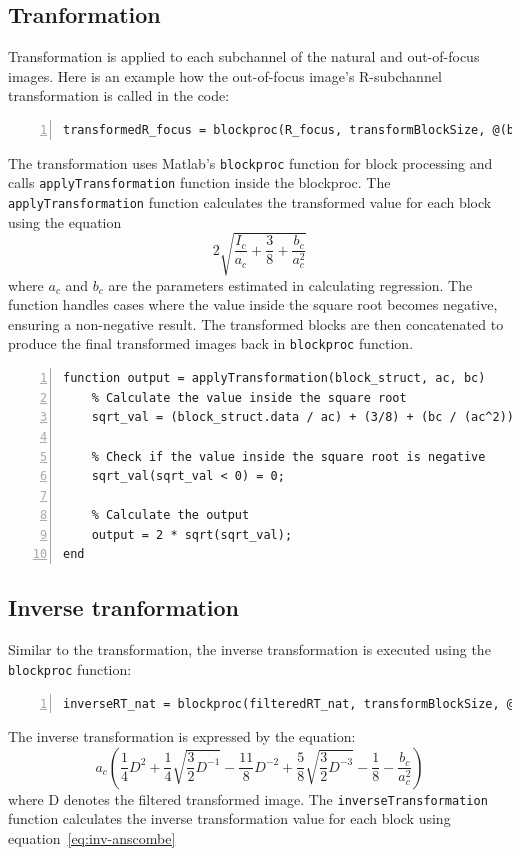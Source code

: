 \documentclass[12pt,a4paper,english
]{tunithesis}
\begin{document}
\subsection{Tranformation}
Transformation is applied to each subchannel of the natural and out-of-focus images. 
 Here is an example how the out-of-focus image's R-subchannel transformation is called in the code:
 \begin{lstlisting}[style=Matlab-editor, numbers=left, basicstyle=\small]
 transformedR_focus = blockproc(R_focus, transformBlockSize, @(block_struct) applyTransformation(block_struct, pR_focus(1), pR_focus(2)));
\end{lstlisting}
The transformation uses Matlab's \texttt{blockproc} function for block processing and calls \texttt{applyTransformation} function inside the blockproc. The \texttt{applyTransformation} function calculates the transformed value for each block using the equation
\begin{equation}
\label{eq:anscombe}
  2 \sqrt{\frac{I_{c}}{a_{c}} + \frac{3}{8} + \frac{b_{c}}{a_{c}^2}}
\end{equation}
 where $a_c$ and $b_c$ are the parameters estimated in calculating regression. The function handles cases where the value inside the square root becomes negative, ensuring a non-negative result. The transformed blocks are then concatenated to produce the final transformed images back in \texttt{blockproc} function.

\begin{lstlisting}[style=Matlab-editor, numbers=left, basicstyle=\small]
% 6. Transformation
function output = applyTransformation(block_struct, ac, bc)
    % Calculate the value inside the square root
    sqrt_val = (block_struct.data / ac) + (3/8) + (bc / (ac^2));

    % Check if the value inside the square root is negative
    sqrt_val(sqrt_val < 0) = 0;

    % Calculate the output
    output = 2 * sqrt(sqrt_val);
end
\end{lstlisting}
\subsection{Inverse tranformation}
Similar to the transformation, the inverse transformation is executed using the \texttt{blockproc} function:
\begin{lstlisting}[style=Matlab-editor, numbers=left, basicstyle=\small]
inverseRT_nat = blockproc(filteredRT_nat, transformBlockSize, @(block_struct) inverseTransformation(block_struct, pR_nat(1), pR_nat(2)));
\end{lstlisting}
The inverse transformation is expressed by the equation:
\begin{equation}
\label{eq:inv-anscombe}
a_c \left( \frac{1}{4} D^2 + \frac{1}{4}\sqrt{\frac{3}{2}D^{-1}} - \frac{11}{8}D^{-2} + \frac{5}{8}\sqrt{\frac{3}{2}D^{-3}} - \frac{1}{8} - \frac{b_c}{a_c^2} \right)
\end{equation}
where D denotes the filtered transformed image. The  \texttt{inverseTransformation} function calculates the inverse transformation value for each block using equation~\ref{eq:inv-anscombe}
\end{document}

